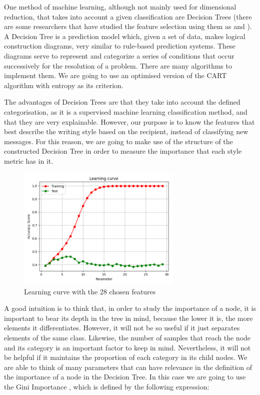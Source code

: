 One method of machine learning, although not mainly used for dimensional reduction, that takes into account a given classification are Decision Trees (there are some researchers that have studied the feature selection using them as \cite{sugumaran2007feature} and \cite{cho2011decision}). A Decision Tree \citep{rokach2008data} is a prediction model which, given a set of data, makes logical construction diagrams, very similar to rule-based prediction systems. These diagrams serve to represent and categorize a series of conditions that occur successively for the resolution of a problem. There are many algorithms to implement them. We are going to use an optimised version of the CART algorithm \citep{breiman1984classification} with entropy as its criterion.

The advantages of Decision Trees are that they take into account the defined categorisation, as it is a supervised machine learning classification method, and that they are very explainable. However, our purpose is to know the features that best describe the writing style based on the recipient, instead of classifying new messages. For this reason, we are going to make use of the structure of the constructed Decision Tree in order to measure the importance that each style metric has in it.

\begin{figure}
	\centering%
	\centerline{\includegraphics[width=0.7\textwidth]{Imagenes/Bitmap/DecisionTrees/learning28curve.png}}%
	\caption{Learning curve with the 28 chosen features}%
	\label{fig:learn28curve}
\end{figure}

A good intuition is to think that, in order to study the importance of a node, it is important to bear its depth in the tree in mind, because the lower it is, the more elements it differentiates. However, it will not be so useful if it just separates elements of the same class. Likewise, the number of samples that reach the node and its category is an important factor to keep in mind. Nevertheless, it will not be helpful if it maintains the proportion of each category in its child nodes. We are able to think of many parameters that can have relevance in the definition of the importance of a node in the Decision Tree. In this case we are going to use the Gini Importance \citep{breiman2001random}, which is defined by the following expression:

